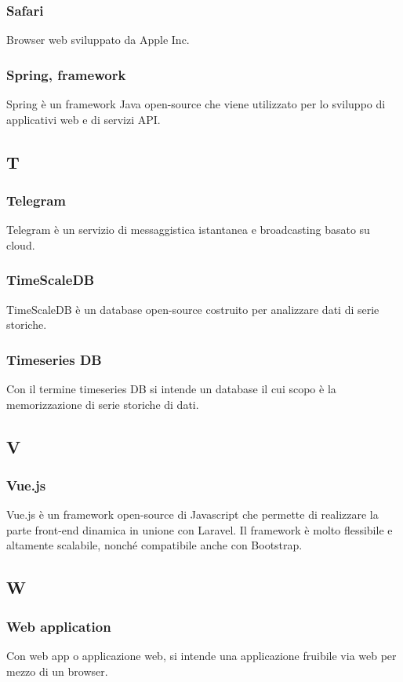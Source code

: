 \subsubsection*{Safari}
Browser web sviluppato da Apple Inc.
\subsubsection*{Spring, framework}  Spring è un framework Java open-source che viene utilizzato per lo sviluppo di applicativi web e di servizi API.
\subsection{T}
\subsubsection*{Telegram}  Telegram è un servizio di messaggistica istantanea e broadcasting basato su cloud.
\subsubsection*{TimeScaleDB}  TimeScaleDB è un database open-source costruito per analizzare dati di serie storiche.
\subsubsection*{Timeseries DB}  Con il termine timeseries DB si intende un database il cui scopo è la memorizzazione di serie storiche di dati.
\subsection{V}
\subsubsection*{Vue.js}  Vue.js è un framework open-source di Javascript che permette di realizzare la parte front-end dinamica in unione con Laravel. Il framework è molto flessibile e altamente scalabile, nonché compatibile anche con Bootstrap.
\subsection{W}
\subsubsection*{Web application}
Con web app o applicazione web, si intende una applicazione fruibile via web per mezzo di un browser.
